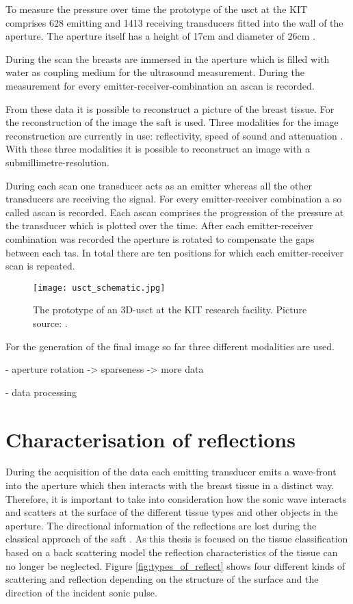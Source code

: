 To measure the pressure over time the prototype of the \ac{usct} at the KIT comprises 628 emitting and 1413 receiving transducers fitted into the wall of the aperture. The aperture itself has a height of 17cm and diameter of 26cm \cite{Kretzek2014GPUAberration}.

During the scan the breasts are immersed in the aperture which is filled with water as coupling medium for the ultrasound measurement. During the measurement for every emitter-receiver-combination an \ac{ascan} is recorded. 

From these data it is possible to reconstruct a picture of the breast tissue. For the reconstruction of the image the \ac{saft} is used.
Three modalities for the image reconstruction are currently in use: reflectivity, speed of sound and attenuation \cite{Jirik2012Sound-speedTomography}.
With these three modalities it is possible to reconstruct an image with a submillimetre-resolution.


During each scan one transducer acts as an emitter whereas all the other transducers are receiving the signal. For every emitter-receiver combination a so called \ac{ascan} is recorded. Each \ac{ascan} comprises the progression of the pressure at the transducer which is plotted over the time. After each emitter-receiver combination was recorded the aperture is rotated to compensate the gaps between each \ac{tas}. In total there are ten positions for which each emitter-receiver scan is repeated.
 


\begin{figure}[H]
    \centering
    \texttt{[image: usct\_schematic.jpg]}
    \caption{The prototype of an 3D-\ac{usct} at the KIT research facility. Picture source: \cite{Kretzek2014GPUAberration}. }
    \label{usct_example}
\end{figure}


For the generation of the final image so far three different modalities are used. 


- aperture rotation -> sparseness -> more data

- data processing




\section{Characterisation of reflections}

During the acquisition of the data each emitting transducer emits a wave-front into the aperture which then interacts with the breast tissue in a distinct way. Therefore, it is important to take into consideration how the sonic wave interacts and scatters at the surface of the different tissue types and other objects in the aperture. The directional information of the reflections are lost during the classical approach of the \ac{saft} \cite{Kretzek2015EvaluationTomography}. As this thesis is focused on the tissue classification based on a back scattering model the reflection characteristics of the tissue can no longer be neglected. Figure \ref{fig:types_of_reflect} shows four different kinds of scattering and reflection depending on the structure of the surface and the direction of the incident sonic pulse.

